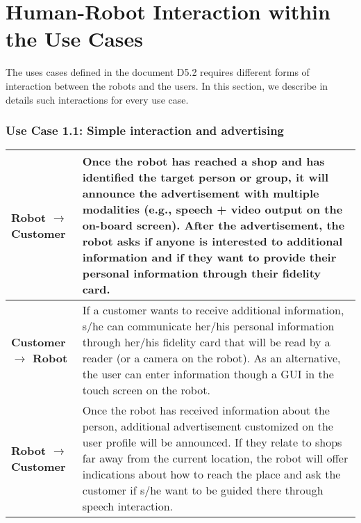 \section{Human-Robot Interaction within the Use Cases}

The uses cases defined in the document D5.2 requires different forms of interaction between the robots and the users. In this section, we describe in details such interactions for every use case.

\subsubsection*{Use Case 1.1: Simple interaction and advertising}

\begin{tabular}{|l|l|}

\hline

{\bf Robot  $\rightarrow$ Customer} &
\begin{minipage}{11cm}
\vspace{1em}
Once the robot has reached a shop and has identified the target person or group,
it will announce the advertisement with multiple modalities (e.g., speech + video output on the
on-board screen). After the advertisement, the robot asks if anyone is interested to additional information and if they want to provide their personal information through their fidelity card.
\vspace{1em}
\end{minipage}

 \\ \hline


{\bf Customer  $\rightarrow$ Robot} &
\begin{minipage}{11cm}
\vspace{1em}
If a customer wants to receive additional information, s/he can communicate her/his personal information through her/his fidelity card that will be read by a reader (or a camera on the robot). As an alternative, the user can enter information though a GUI in the touch screen on the robot.
\vspace{1em}
\end{minipage}

\\ \hline

{\bf Robot  $\rightarrow$ Customer} &
\begin{minipage}{11cm}
\vspace{1em}
Once the robot has received information about the person, additional advertisement customized on the user profile will be announced. If they relate to shops far away from the current location, the robot will offer indications about how to reach the place and ask the customer if s/he want to be guided there through speech interaction.
\vspace{1em}
\end{minipage}

\\ \hline

\end{tabular}



